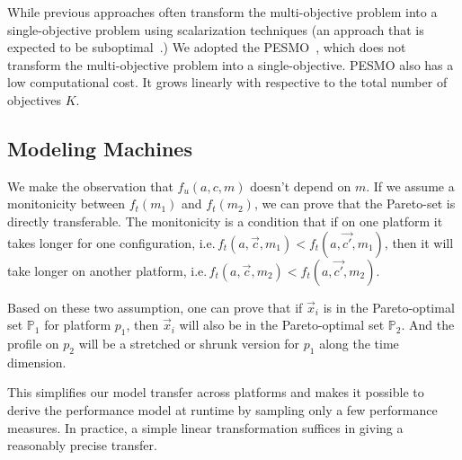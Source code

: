 While previous approaches often transform the multi-objective problem into a
single-objective problem using scalarization techniques (an approach that is
expected to be suboptimal~\cite{knowles2006parego}.) We adopted the
PESMO~\cite{hernandez2016predictive}, which does not transform the
multi-objective problem into a single-objective. PESMO also has a low
computational cost. It grows linearly with respective to the total number of
objectives $K$.

\subsection{Modeling Machines}
\label{sec:performance-transfer}

We make the observation that $f_u(a, c, m)$ doesn't depend on $m$. If we assume
a monitonicity between $f_t(m_1)$ and $f_t(m_2)$, we can prove that the
Pareto-set is directly transferable. The monitonicity is a condition that if on
one platform it takes longer for one configuration,
i.e.\,$f_t(a, \vec{c}, m_1) < f_t(a, \vec{c'}, m_1)$, then it will take longer
on another platform, i.e.\,$f_t(a, \vec{c}, m_2) < f_t(a, \vec{c'}, m_2)$.

Based on these two assumption, one can prove that if $\vec{x}_i$ is in the
Pareto-optimal set $\mathbb{P}_1$ for platform $p_1$, then $\vec{x}_i$ will also
be in the Pareto-optimal set $\mathbb{P}_2$. And the profile on $p_2$ will be a
stretched or shrunk version for $p_1$ along the time dimension.

This simplifies our model transfer across platforms and makes it possible to
derive the performance model at runtime by sampling only a few performance
measures. In practice, a simple linear transformation suffices in giving a
reasonably precise transfer.
